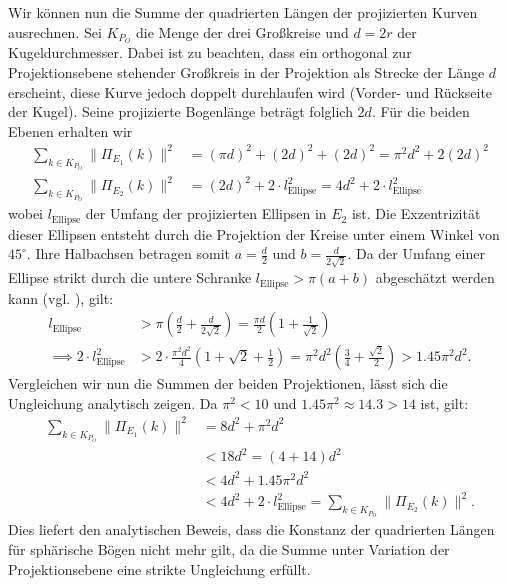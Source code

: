 Wir können nun die Summe der quadrierten Längen der projizierten Kurven ausrechnen. Sei $K_{P_O}$ die Menge der drei Großkreise und $d=2r$ der Kugeldurchmesser. Dabei ist zu beachten, dass ein orthogonal zur Projektionsebene stehender Großkreis in der Projektion als Strecke der Länge $d$ erscheint, diese Kurve jedoch doppelt durchlaufen wird (Vorder- und Rückseite der Kugel). Seine projizierte Bogenlänge beträgt folglich $2d$. Für die beiden Ebenen erhalten wir
\begin{align}
    \sum_{k \in K_{P_O}} \|\Pi_{E_1}(k)\|^2 &= (\pi d)^2 + (2d)^2 + (2d)^2 = \pi^2 d^2 + 2(2d)^2 \nonumber \\
    \sum_{k \in K_{P_O}} \|\Pi_{E_2}(k)\|^2 &= (2d)^2 + 2 \cdot l_{\text{Ellipse}}^2 = 4d^2 + 2 \cdot l_{\text{Ellipse}}^2 \nonumber
\end{align}
wobei $l_{\text{Ellipse}}$ der Umfang der projizierten Ellipsen in $E_2$ ist. Die Exzentrizität dieser Ellipsen entsteht durch die Projektion der Kreise unter einem Winkel von $45^\circ$. Ihre Halbachsen betragen somit $a = \frac{d}{2}$ und $b = \frac{d}{2\sqrt{2}}$. Da der Umfang einer Ellipse strikt durch die untere Schranke $l_{\text{Ellipse}} > \pi(a+b)$ abgeschätzt werden kann (vgl. \cite{almkvist1988gauss}), gilt:
\begin{align}
    l_{\text{Ellipse}} &> \pi \left( \frac{d}{2} + \frac{d}{2\sqrt{2}} \right) = \frac{\pi d}{2} \left( 1 + \frac{1}{\sqrt{2}} \right) \nonumber \\
    \implies 2 \cdot l_{\text{Ellipse}}^2 &> 2 \cdot \frac{\pi^2 d^2}{4} \left( 1 + \sqrt{2} + \frac{1}{2} \right) = \pi^2 d^2 \left( \frac{3}{4} + \frac{\sqrt{2}}{2} \right) > 1.45 \pi^2 d^2 . \nonumber
\end{align}
Vergleichen wir nun die Summen der beiden Projektionen, lässt sich die Ungleichung analytisch zeigen. Da $\pi^2 < 10$ und $1.45 \pi^2 \approx 14.3 > 14$ ist, gilt:
\begin{align}
    \sum_{k \in K_{P_O}} \|\Pi_{E_1}(k)\|^2 &= 8d^2 + \pi^2 d^2 \nonumber \\
    &< 18d^2 = (4 + 14) d^2 \nonumber \\ 
    &< 4d^2 + 1.45 \pi^2 d^2 \nonumber \\
    &< 4d^2 + 2 \cdot l_{\text{Ellipse}}^2 = \sum_{k \in K_{P_O}} \|\Pi_{E_2}(k)\|^2. \nonumber
\end{align}
Dies liefert den analytischen Beweis, dass die Konstanz der quadrierten Längen für sphärische Bögen nicht mehr gilt, da die Summe unter Variation der Projektionsebene eine strikte Ungleichung erfüllt.